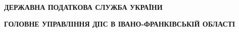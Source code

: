 

\begin{center}
	{ 	\textbf{ДЕРЖАВНА ПОДАТКОВА СЛУЖБА УКРАЇНИ}}\\
	\vspace{1mm}
	
	{\small	\textbf{ГОЛОВНЕ УПРАВЛІННЯ ДПС В ІВАНО-ФРАНКІВСЬКІЙ ОБЛАСТІ}}\\
	
	\vspace{1mm}

	
\end{center}
\nopagebreak[4]
